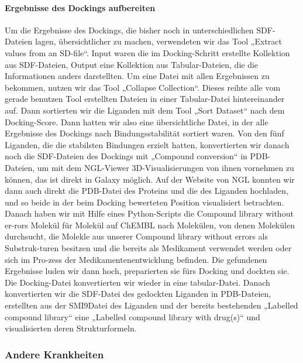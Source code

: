 \documentclass[10pt]{article}
\begin{document}
{    \paragraph{Ergebnisse des Dockings aufbereiten}
    Um die Ergebnisse des Dockings, die bisher noch in unterschiedlichen SDF-Dateien lagen, übersichtlicher zu machen, verwendeten wir das Tool „Extract values from an SD-file“. Input waren die im Docking-Schritt erstellte Kollektion aus SDF-Dateien, Output eine Kollektion aus Tabular-Dateien, die die Informationen anders darstellten.
    Um eine Datei mit allen Ergebnissen zu bekommen, nutzen wir das Tool „Collapse Collection“. Dieses reihte alle vom gerade benutzen Tool erstellten Dateien in einer Tabular-Datei hintereinander auf. Dann sortierten wir die Liganden mit dem Tool „Sort Dataset“ nach dem Docking-Score.
    Dann hatten wir also eine übersichtliche Datei, in der alle Ergebnisse des Dockings nach Bindungsstabilität sortiert waren.
    Von den fünf Liganden, die die stabilsten Bindungen erzielt hatten, konvertierten wir danach noch die SDF-Dateien des Dockings mit „Compound conversion“ in PDB-Dateien, um mit dem NGL-Viewer 3D-Visualisierungen von ihnen vornehmen zu können, das ist direkt in Galaxy möglich.
    Auf der Website von NGL konnten wir dann auch direkt die PDB-Datei des Proteins und die des Liganden hochladen, und so beide in der beim Docking bewerteten Position visualisiert betrachten.
    Danach haben wir mit Hilfe eines Python-Scripts die Compound library without er-rors Molekül für Molekül auf ChEMBL nach Molekülen, von denen Molekülen durchsucht, die Molekle aus unserer Compound library without errors als Substruk-turen besitzen und die bereits als Medikament verwendet werden oder sich im Pro-zess der Medikamentenentwicklung befinden. Die gefundenen Ergebnisse luden wir dann hoch, preparierten sie fürs Docking und dockten sie. Die Docking-Datei konvertierten wir wieder in eine tabular-Datei. Danach konvertierten wir die SDF-Datei des gedockten Liganden in PDB-Dateien, erstellten aus der SMI9Datei des Liganden und der bereits bestehenden „Labelled compound library“ eine „Labelled compound library with drug(s)“ und visualisierten deren Strukturformeln.

    


    \subsubsection{Andere Krankheiten}

}
\end{document}
